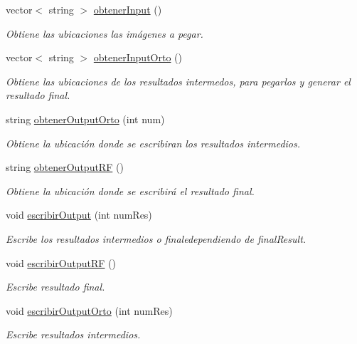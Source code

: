 \begin{DoxyCompactItemize}
vector$<$ string $>$ \mbox{\hyperlink{classuav_1_1Stitcher_a33521f40ecd0a4b57e3433b32c33f872}{obtener\+Input}} ()
\begin{DoxyCompactList}\small\item\em Obtiene las ubicaciones las imágenes a pegar. \end{DoxyCompactList}\item 
vector$<$ string $>$ \mbox{\hyperlink{classuav_1_1Stitcher_a4a31cc35b3bc69697cdaa8094d4490b8}{obtener\+Input\+Orto}} ()
\begin{DoxyCompactList}\small\item\em Obtiene las ubicaciones de los resultados intermedos, para pegarlos y generar el resultado final. \end{DoxyCompactList}\item 
string \mbox{\hyperlink{classuav_1_1Stitcher_a2f5433b17c42c874359f7f92148b4ee2}{obtener\+Output\+Orto}} (int num)
\begin{DoxyCompactList}\small\item\em Obtiene la ubicación donde se escribiran los resultados intermedios. \end{DoxyCompactList}\item 
string \mbox{\hyperlink{classuav_1_1Stitcher_a5f6f8f09c80f39daf9f2ea34e0db91b9}{obtener\+Output\+RF}} ()
\begin{DoxyCompactList}\small\item\em Obtiene la ubicación donde se escribirá el resultado final. \end{DoxyCompactList}\item 
void \mbox{\hyperlink{classuav_1_1Stitcher_a079c00542221b0e2fc551d2e97df7b97}{escribir\+Output}} (int num\+Res)
\begin{DoxyCompactList}\small\item\em Escribe los resultados intermedios o finaledependiendo de final\+Result. \end{DoxyCompactList}\item 
\mbox{\label{classuav_1_1Stitcher_aedccb071e6ee13405e842c0764a08ecd}} 
void \mbox{\hyperlink{classuav_1_1Stitcher_aedccb071e6ee13405e842c0764a08ecd}{escribir\+Output\+RF}} ()
\begin{DoxyCompactList}\small\item\em Escribe resultado final. \end{DoxyCompactList}\item 
void \mbox{\hyperlink{classuav_1_1Stitcher_aa3ed2d63f08d787b3b78ec4445195b2b}{escribir\+Output\+Orto}} (int num\+Res)
\begin{DoxyCompactList}\small\item\em Escribe resultados intermedios. \end{DoxyCompactList}\end{DoxyCompactItemize}
